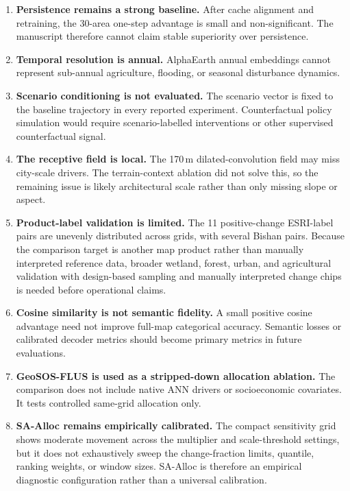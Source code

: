 \documentclass{article}
\begin{document}
\begin{enumerate}
\item \label{lim:power} \textbf{Persistence remains a strong baseline.} After cache alignment and retraining, the 30-area one-step advantage is small and non-significant. The manuscript therefore cannot claim stable superiority over persistence.

\item \label{lim:temporal} \textbf{Temporal resolution is annual.} AlphaEarth annual embeddings cannot represent sub-annual agriculture, flooding, or seasonal disturbance dynamics.

\item \label{lim:scenario} \textbf{Scenario conditioning is not evaluated.} The scenario vector is fixed to the baseline trajectory in every reported experiment. Counterfactual policy simulation would require scenario-labelled interventions or other supervised counterfactual signal.

\item \label{lim:receptive} \textbf{The receptive field is local.} The 170\,m dilated-convolution field may miss city-scale drivers. The terrain-context ablation did not solve this, so the remaining issue is likely architectural scale rather than only missing slope or aspect.

\item \label{lim:reference} \textbf{Product-label validation is limited.} The 11 positive-change ESRI-label pairs are unevenly distributed across grids, with several Bishan pairs. Because the comparison target is another map product rather than manually interpreted reference data, broader wetland, forest, urban, and agricultural validation with design-based sampling and manually interpreted change chips is needed before operational claims.

\item \label{lim:cosine_semantic} \textbf{Cosine similarity is not semantic fidelity.} A small positive cosine advantage need not improve full-map categorical accuracy. Semantic losses or calibrated decoder metrics should become primary metrics in future evaluations.

\item \label{lim:flus_scope} \textbf{GeoSOS-FLUS is used as a stripped-down allocation ablation.} The comparison does not include native ANN drivers or socioeconomic covariates. It tests controlled same-grid allocation only.

\item \label{lim:magic_numbers} \textbf{SA-Alloc remains empirically calibrated.} The compact sensitivity grid shows moderate movement across the multiplier and scale-threshold settings, but it does not exhaustively sweep the change-fraction limits, quantile, ranking weights, or window sizes. SA-Alloc is therefore an empirical diagnostic configuration rather than a universal calibration.


\end{enumerate}
\end{document}
